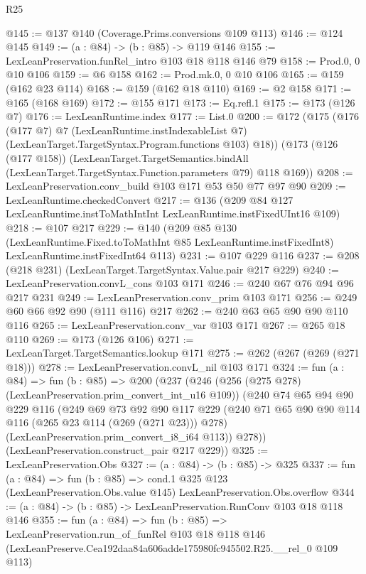 \begin{lexlean}{R25}
\begin{coremodule}
@145 := @137 @140 (Coverage.Prims.conversions @109 @113)
@146 := @124 @145
@149 := (a : @84) -> (b : @85) -> @119 @146
@155 := LexLeanPreservation.funRel_intro @103 @18 @118 @146 @79
@158 := Prod.{0, 0} @10 @106
@159 := @6 @158
@162 := Prod.mk.{0, 0} @10 @106
@165 := @159 (@162 @23 @114)
@168 := @159 (@162 @18 @110)
@169 := @2 @158
@171 := @165 (@168 @169)
@172 := @155 @171
@173 := Eq.refl.{1}
@175 := @173 (@126 @7)
@176 := LexLeanRuntime.index
@177 := List.{0}
@200 := @172
    (@175
      (@176
        (@177 @7)
        @7
        (LexLeanRuntime.instIndexableList @7)
        (LexLeanTarget.TargetSyntax.Program.functions @103)
        @18))
    (@173
      (@126 (@177 @158))
      (LexLeanTarget.TargetSemantics.bindAll
        (LexLeanTarget.TargetSyntax.Function.parameters @79)
        @118
        @169))
@208 := LexLeanPreservation.conv_build @103 @171 @53 @50 @77 @97 @90
@209 := LexLeanRuntime.checkedConvert
@217 := @136 (@209 @84 @127 LexLeanRuntime.instToMathIntInt LexLeanRuntime.instFixedUInt16 @109)
@218 := @107 @217
@229 := @140
    (@209
      @85
      @130
      (LexLeanRuntime.Fixed.toToMathInt @85 LexLeanRuntime.instFixedInt8)
      LexLeanRuntime.instFixedInt64
      @113)
@231 := @107 @229 @116
@237 := @208 (@218 @231) (LexLeanTarget.TargetSyntax.Value.pair @217 @229)
@240 := LexLeanPreservation.convL_cons @103 @171
@246 := @240 @67 @76 @94 @96 @217 @231
@249 := LexLeanPreservation.conv_prim @103 @171
@256 := @249 @60 @66 @92 @90 (@111 @116) @217
@262 := @240 @63 @65 @90 @90 @110 @116
@265 := LexLeanPreservation.conv_var @103 @171
@267 := @265 @18 @110
@269 := @173 (@126 @106)
@271 := LexLeanTarget.TargetSemantics.lookup @171
@275 := @262 (@267 (@269 (@271 @18)))
@278 := LexLeanPreservation.convL_nil @103 @171
@324 := fun (a : @84) =>
  fun (b : @85) =>
  @200
    (@237
      (@246
        (@256 (@275 @278) (LexLeanPreservation.prim_convert_int_u16 @109))
        (@240
          @74
          @65
          @94
          @90
          @229
          @116
          (@249
            @69
            @73
            @92
            @90
            @117
            @229
            (@240 @71 @65 @90 @90 @114 @116 (@265 @23 @114 (@269 (@271 @23))) @278)
            (LexLeanPreservation.prim_convert_i8_i64 @113))
          @278))
      (LexLeanPreservation.construct_pair @217 @229))
@325 := LexLeanPreservation.Obs
@327 := (a : @84) -> (b : @85) -> @325
@337 := fun (a : @84) =>
  fun (b : @85) =>
  cond.{1} @325 @123 (LexLeanPreservation.Obs.value @145) LexLeanPreservation.Obs.overflow
@344 := (a : @84) -> (b : @85) -> LexLeanPreservation.RunConv @103 @18 @118 @146
@355 := fun (a : @84) =>
  fun (b : @85) =>
  LexLeanPreservation.run_of_funRel
    @103
    @18
    @118
    @146
    (LexLeanPreserve.Cea192daa84a606adde175980fc945502.R25.__rel_0 @109 @113)
\end{coremodule}
\end{lexlean}
